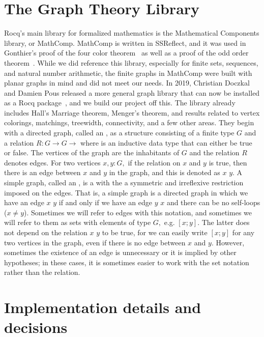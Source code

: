 \section{The Graph Theory Library}\label{section library}
Rocq's main library for formalized mathematics is the Mathematical Components library, or MathComp. MathComp is written in SSReflect, and it was used in Gonthier's proof of the four color theorem~\cite{4CRocq} as well as a proof of the odd order theorem~\cite{groupTheory}. While we did reference this library, especially for finite sets, sequences, and natural number arithmetic, the finite graphs in MathComp were built with planar graphs in mind and did not meet our needs. In 2019, Christian Doczkal and Damien Pous released a more general graph library that can now be installed as a Rocq package~\cite{Doczkal, graphLibRock}, and we build our project off this. The library already includes Hall's Marriage theorem, Menger's theorem, and results related to vertex colorings, matchings, treewidth, connectivity, and a few other areas. They begin with a directed graph, called an , as a structure consisting of a finite type $G$ and a relation $R: G \to G \to$  where  is an inductive data type that can either be true or false. The vertices of the graph are the inhabitants of $G$ and the relation $R$ denotes edges. For two vertices $x, y : G,$ if the relation on $x$ and $y$ is true, then there is an edge between $x$ and $y$ in the graph, and this is denoted as $x$ \fxn{--} $y.$ A simple graph, called an , is a  with the a symmetric and irreflexive restriction imposed on the edges. That is, a simple graph is a directed graph in which we have an edge $x$ \fxn{--} $y$ if and only if we have an edge $y$ \fxn{--} $x$ and there can be no self-loops ($x \neq y$). Sometimes we will refer to edges with this notation, and sometimes we will refer to them as sets with elements of type $G,$ e.g. $[x; y].$ The latter does not depend on the relation $x$ \fxn{--} $y$ to be true, for we can easily write $[x; y]$ for any two vertices in the graph, even if there is no edge between $x$ and $y.$ However, sometimes the existence of an edge is unnecessary or it is implied by other hypotheses; in these cases, it is sometimes easier to work with the set notation rather than the relation.

\section{Implementation details and decisions}\label{section d&d}
